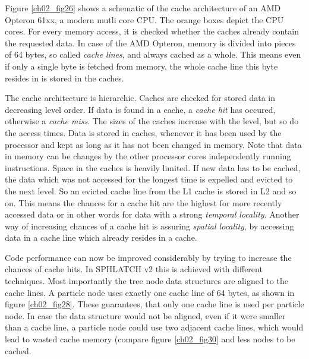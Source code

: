 Figure \ref{ch02_fig26} shows a schematic of the cache architecture of an AMD Opteron 61xx, a modern mutli core CPU. The orange boxes depict the CPU cores. For every memory access, it is checked whether the caches already contain the requested data. In case of the AMD Opteron, memory is divided into pieces of 64 bytes, so called \emph{cache lines}, and always cached as a whole. This means even if only a single byte is fetched from memory, the whole cache line this byte resides in is stored in the caches.

The cache architecture is hierarchic. Caches are checked for stored data in decreasing level order. If data is found in a cache, a \emph{cache hit} has occured, otherwise a \emph{cache miss}. The sizes of the caches increase with the level, but so do the access times. Data is stored in caches, whenever it has been used by the processor and kept as long as it has not been changed in memory. Note that data in memory can be changes by the other processor cores independently running instructions. Space in the caches is heavily limited. If new data has to be cached, the data which was not accessed for the longest time is expelled and evicted to the next level. So an evicted cache line from the L1 cache is stored in L2 and so on. This means the chances for a cache hit are the highest for more recently accessed data or in other words for data with a strong \emph{temporal locality}. Another way of increasing chances of a cache hit is assuring \emph{spatial locality}, by accessing data in a cache line which already resides in a cache.

Code performance can now be improved considerably by trying to increase the chances of cache hits. In SPHLATCH v2 this is achieved with different techniques. Most importantly the tree node data structures are aligned to the cache lines. A particle node uses exactly one cache line of 64 bytes, as shown in figure \ref{ch02_fig28}. These guarantees, that only one cache line is used per particle node. In case the data structure would not be aligned, even if it were smaller than a cache line, a particle node could use two adjacent cache lines, which would lead to wasted cache memory (compare figure \ref{ch02_fig30} and less nodes to be cached.

